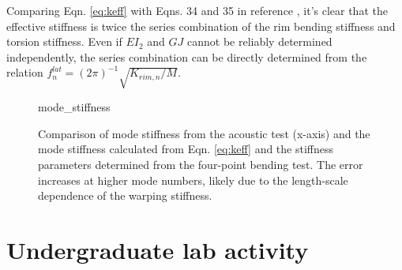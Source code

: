 \documentclass[../thesis.tex]{subfiles}
\begin{document}
Comparing Eqn. \eqref{eq:keff} with Eqns. 34 and 35 in reference \cite{Ford2016a}, it's clear that the effective stiffness is twice the series combination of the rim bending stiffness and torsion stiffness. Even if $EI_{2}$ and $GJ$ cannot be reliably determined independently, the series combination can be directly determined from the relation $f_n^{lat} = (2\pi)^{-1}\sqrt{K_{rim,n}/M}$.

\begin{figure}
  {mode_stiffness}
  \caption{Comparison of mode stiffness from the acoustic test (x-axis) and the mode stiffness calculated from Eqn. \eqref{eq:keff} and the stiffness parameters determined from the four-point bending test. The error increases at higher mode numbers, likely due to the length-scale dependence of the warping stiffness.}
  \label{fig:keff}
\end{figure}


\section{Undergraduate lab activity}
\end{document}
